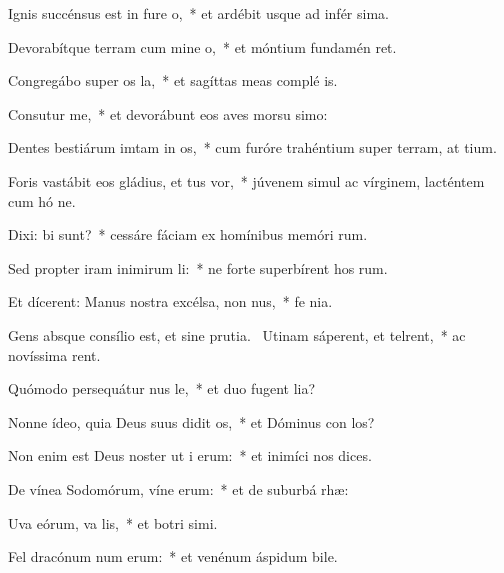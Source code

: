 \item Ignis succénsus est in fure o,~* et ardébit usque ad infér sima.
\item Devorabítque terram cum mine o,~* et móntium fundamén ret.
\item Congregábo super os la,~* et sagíttas meas complé  is.
\item Consutur me,~* et devorábunt eos aves morsu simo:
\item Dentes bestiárum imtam in os,~* cum furóre trahéntium super terram, at tium.
\item Foris vastábit eos gládius, et tus vor,~* júvenem simul ac vírginem, lacténtem cum hó ne.
\item Dixi: bi sunt?~* cessáre fáciam ex homínibus memóri rum.
\item Sed propter iram inimirum li:~* ne forte superbírent hos rum.
\item Et dícerent: Manus nostra excélsa,  non nus,~* fe  nia.
\item Gens absque consílio est, et sine prutia.~\pscross{} Utinam sáperent, et telrent,~* ac novíssima rent.
\item Quómodo persequátur nus le,~* et duo fugent  lia?
\item Nonne ídeo, quia Deus suus didit os,~* et Dóminus con los?
\item Non enim est Deus noster ut i erum:~* et inimíci nos  dices.
\item De vínea Sodomórum, víne erum:~* et de suburbá rhæ:
\item Uva eórum, va lis,~* et botri simi.
\item Fel dracónum num erum:~* et venénum áspidum bile.
